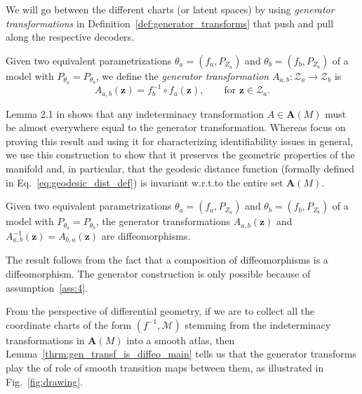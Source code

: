 We will go between the different charts (or latent spaces) by using \emph{generator transformations} in Definition~\ref{def:generator_transforms} that push and pull along the respective decoders. 
%
\begin{definition}
\label{def:generator_transforms}
  Given two equivalent parametrizations $\theta_a=\left(f_a, P_{Z_a}\right)$ and $\theta_b=\left(f_b, P_{Z_b}\right)$ of a model with $P_{\theta_a}=P_{\theta_b}$, we define the \emph{generator transformation} $A_{a, b}:\mathcal{Z}_a\rightarrow \mathcal{Z}_b$ is
    \begin{equation}
\label{eq:gen_transform}
    A_{a, b}(\mathbf{z}) = f_b^{-1}\circ f_a(\mathbf{z}), \qquad \text{for } \mathbf{z}\in \mathcal{Z}_a.
\end{equation}
\end{definition}
%
Lemma 2.1 in \citet{xi2023indeterminacy}  shows that any indeterminacy transformation $A \in \mathbf{A}(M)$ must be almost everywhere equal to the generator transformation. Whereas \citeauthor{xi2023indeterminacy} focus on proving this result and using it for characterizing identifiability issues in general, we use this construction to show that it preserves the geometric properties of the manifold and, in particular, that the geodesic distance function (formally defined in Eq.~\ref{eq:geodesic_dist_def}) is invariant w.r.t.\@ to the entire set $\mathbf{A}(M)$.
%
\begin{lemma} \label{thrm:gen_transf_is_diffeo_main}
    Given two equivalent parametrizations $\theta_a=\left(f_a, P_{Z_a}\right)$ and $\theta_b=\left(f_b, P_{Z_b}\right)$ of a model with $P_{\theta_a}=P_{\theta_b}$, the generator transformations $A_{a, b}(\mathbf{z})$ and $A^{-1}_{a, b}(\mathbf{z})=A_{b, a}(\mathbf{z})$ are diffeomorphisms.
\end{lemma}
%
\begin{proofsketch}
The result follows from the fact that a composition of diffeomorphisms is a diffeomorphism. The generator construction is only possible because of assumption~\ref{ass:4}.
\end{proofsketch}
%
From the perspective of differential geometry, if we are to collect all the coordinate charts of the form $(f^{-1},\mathcal{M})$ stemming from the indeterminacy transformations in $\mathbf{A}(M)$ into a smooth atlas, then Lemma~\ref{thrm:gen_transf_is_diffeo_main} tells us that the generator transforms play the of role of smooth transition maps between them, as illustrated in Fig.~\ref{fig:drawing}.

